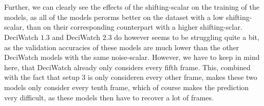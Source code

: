 \documentclass[./main.tex]{subfiles}
\begin{document}
\\
\\
Further, we can clearly see the effects of the shifting-scalar on the training of the models, as all of the models perorms better on the dataset with a low shifting-scalar, than on their corresponding counterpart with a higher shifting-sclar. DeciWatch $1.3$ and DeciWatch $2.3$ do however seems to be struggling quite a bit, as the validation accuracies of these models are much lower than the other DeciWatch models with the same noise-scalar. However, we have to keep in mind here, that DeciWatch already only considers every fifth frame. This, combined with the fact that setup $3$ is only consideren every other frame, makes these two models only consider every tenth frame, which of course makes the prediction very difficult, as these models then have to recover a lot of frames.
\end{document}
